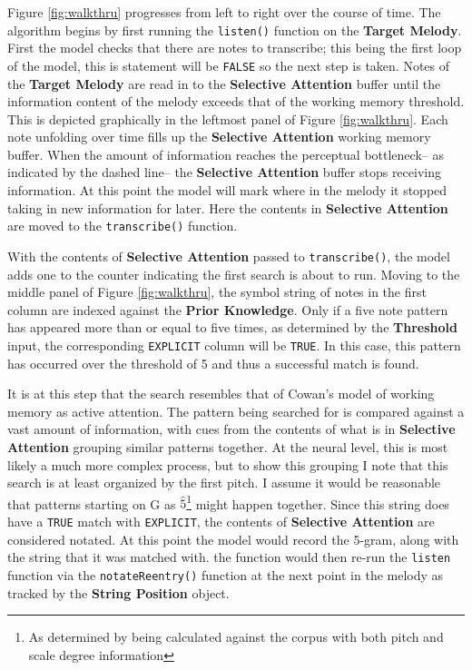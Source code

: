 \documentclass[]{book}
\let\rmarkdownfootnote\footnote%
\def\footnote{\protect\rmarkdownfootnote}
\begin{document}
Figure \ref{fig:walkthru} progresses from left to right over the course of time.
The algorithm begins by first running the \texttt{listen()} function on the \textbf{Target Melody}.
First the model checks that there are notes to transcribe; this being the first loop of the model, this is statement will be \texttt{FALSE} so the next step is taken.
Notes of the \textbf{Target Melody} are read in to the \textbf{Selective Attention} buffer until the information content of the melody exceeds that of the working memory threshold.
This is depicted graphically in the leftmost panel of Figure \ref{fig:walkthru}.
Each note unfolding over time fills up the \textbf{Selective Attention} working memory buffer.
When the amount of information reaches the perceptual bottleneck-- as indicated by the dashed line-- the \textbf{Selective Attention} buffer stops receiving information.
At this point the model will mark where in the melody it stopped taking in new information for later.
Here the contents in \textbf{Selective Attention} are moved to the \texttt{transcribe()} function.

With the contents of \textbf{Selective Attention} passed to \texttt{transcribe()}, the model adds one to the counter indicating the first search is about to run.
Moving to the middle panel of Figure \ref{fig:walkthru}, the symbol string of notes in the first column are indexed against the \textbf{Prior Knowledge}.
Only if a five note pattern has appeared more than or equal to five times, as determined by the \textbf{Threshold} input, the corresponding \texttt{EXPLICIT} column will be \texttt{TRUE}.
In this case, this pattern has occurred over the threshold of 5 and thus a successful match is found.

It is at this step that the search resembles that of Cowan's model of working memory as active attention.
The pattern being searched for is compared against a vast amount of information, with cues from the contents of what is in \textbf{Selective Attention} grouping similar patterns together.
At the neural level, this is most likely a much more complex process, but to show this grouping I note that this search is at least organized by the first pitch.
I assume it would be reasonable that patterns starting on G as \(\hat{5}\)\footnote{As determined by being calculated against the corpus with both pitch and scale degree information} might happen together.
Since this string does have a \texttt{TRUE} match with \texttt{EXPLICIT}, the contents of \textbf{Selective Attention} are considered notated.
At this point the model would record the 5-gram, along with the string that it was matched with.
the function would then re-run the \texttt{listen} function via the \texttt{notateReentry()} function at the next point in the melody as tracked by the \textbf{String Position} object.
\end{document}
